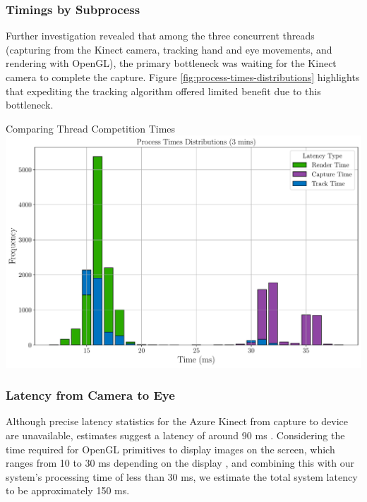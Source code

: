 \subsubsection{Timings by Subprocess}

Further investigation revealed that among the three concurrent threads (capturing from the Kinect camera, tracking hand and eye movements, and rendering with OpenGL), the primary bottleneck was waiting for the Kinect camera to complete the capture. Figure \ref{fig:process-times-distributions} highlights that expediting the tracking algorithm offered limited benefit due to this bottleneck.

\begin{figureBox}[label={fig:process-times-distributions}, width=1.0\linewidth]{Comparing Thread Competition Times}
    \includegraphics[width = 1.0\linewidth]{./evaluation/figures/process-times-distributions.pdf}
\end{figureBox}

\subsubsection{Latency from Camera to Eye}

Although precise latency statistics for the Azure Kinect from capture to device are unavailable, estimates suggest a latency of around 90 ms \cite{gholami2023autodepthnet}. Considering the time required for OpenGL primitives to display images on the screen, which ranges from 10 to 30 ms depending on the display \cite{https://doi.org/10.1002/jsid.1104} \cite{noauthor_latency_nodate}, and combining this with our system's processing time of less than 30 ms, we estimate the total system latency to be approximately 150 ms. \\

